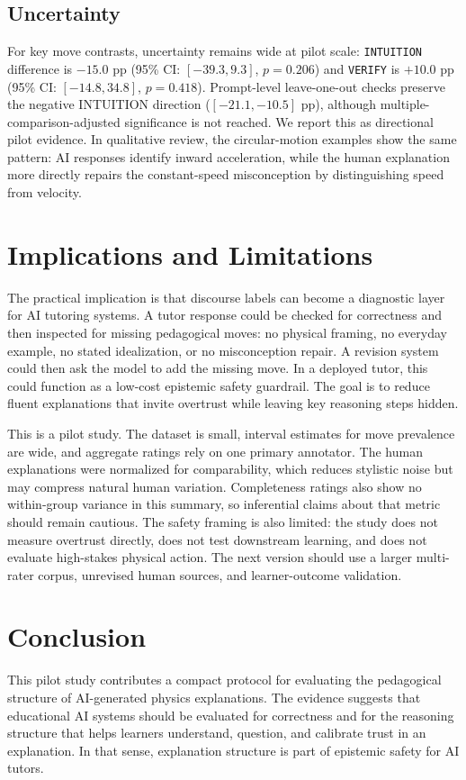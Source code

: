\documentclass{article}
\begin{document}
\subsection{Uncertainty}
For key move contrasts, uncertainty remains wide at pilot scale: \texttt{INTUITION} difference is $-15.0$ pp (95\% CI: $[-39.3, 9.3]$, $p=0.206$) and \texttt{VERIFY} is $+10.0$ pp (95\% CI: $[-14.8, 34.8]$, $p=0.418$).
Prompt-level leave-one-out checks preserve the negative INTUITION direction ($[-21.1,-10.5]$ pp), although multiple-comparison-adjusted significance is not reached. We report this as directional pilot evidence. In qualitative review, the circular-motion examples show the same pattern: AI responses identify inward acceleration, while the human explanation more directly repairs the constant-speed misconception by distinguishing speed from velocity.

\section{Implications and Limitations}
The practical implication is that discourse labels can become a diagnostic layer for AI tutoring systems. A tutor response could be checked for correctness and then inspected for missing pedagogical moves: no physical framing, no everyday example, no stated idealization, or no misconception repair. A revision system could then ask the model to add the missing move. In a deployed tutor, this could function as a low-cost epistemic safety guardrail. The goal is to reduce fluent explanations that invite overtrust while leaving key reasoning steps hidden.

This is a pilot study. The dataset is small, interval estimates for move prevalence are wide, and aggregate ratings rely on one primary annotator. The human explanations were normalized for comparability, which reduces stylistic noise but may compress natural human variation. Completeness ratings also show no within-group variance in this summary, so inferential claims about that metric should remain cautious. The safety framing is also limited: the study does not measure overtrust directly, does not test downstream learning, and does not evaluate high-stakes physical action. The next version should use a larger multi-rater corpus, unrevised human sources, and learner-outcome validation.

\section{Conclusion}
This pilot study contributes a compact protocol for evaluating the pedagogical structure of AI-generated physics explanations. The evidence suggests that educational AI systems should be evaluated for correctness and for the reasoning structure that helps learners understand, question, and calibrate trust in an explanation. In that sense, explanation structure is part of epistemic safety for AI tutors.



\end{document}
